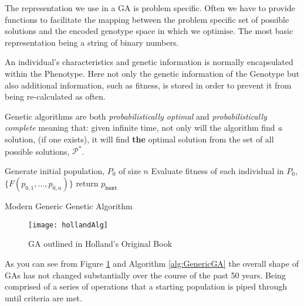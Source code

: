 The representation we use in a GA is problem specific. Often we have to provide functions to facilitate the mapping between the problem specific set of possible solutions and the encoded genotype space in which we optimise. The most basic representation being a string of binary numbers.

An individual's characteristics and genetic information is normally encapsulated within the Phenotype. Here not only the genetic information of the Genotype but also additional information, such as fitness, is stored in order to prevent it from being re-calculated as often.

Genetic algorithms are both \textit{probabilistically optimal} and \textit{probabilistically complete}\cite{kalaOnroadIntelligentVehicles2016} meaning that: given infinite time, not only will the algorithm find \textit{a} solution, (if one exists), it will find \textbf{the} optimal solution from the set of all possible solutions, $\mathcal{P}^*$.

\begin{algorithm}[H]
	\label{alg:GenericGA}
	\SetAlgoLined
	Generate initial population, $P_0$ of size $n$\;
	Evaluate fitness of each individual in $P_0$, $\{F(p_{0,1},\ldots, p_{0,n})\}$\;
	return $p_{\texttt{best}}$

	\caption{Modern Generic Genetic Algorithm}
\end{algorithm}

\begin{figure}[htpb]
    \centering
    \texttt{[image: hollandAlg]}
    \caption{GA outlined in Holland's Original Book\cite{hollandAdaptationNaturalArtificial1992}}
    \label{fig:hollandAlg}
\end{figure}

As you can see from Figure \ref{fig:hollandAlg} and Algorithm \ref{alg:GenericGA} the overall shape of GAs has not changed substantially over the course of the past 50 years. Being comprised of a series of operations that a starting population is piped through until criteria are met.

